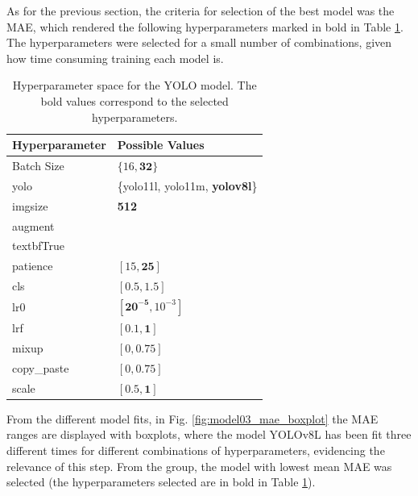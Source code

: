 \documentclass[conference]{IEEEtran}
\begin{document}
As for the previous section, the criteria for selection of the best model was the MAE, which rendered the following hyperparameters marked in bold in Table \ref{parametrosobjid}. The hyperparameters were selected for a small number of combinations, given how time consuming training each model is.



\begin{table}[H]
\centering
\caption{Hyperparameter space for the YOLO model. The bold values correspond to the selected hyperparameters.}
\label{parametrosobjid}
\begin{tabular}{ll}
\toprule
\textbf{Hyperparameter} & \textbf{Possible Values} \\
\midrule
Batch Size & $\{16, \mathbf{32}\}$ \\
yolo & \{yolo11l, yolo11m, \textbf{yolov8l}\} \\
imgsize & \textbf{512} \\
augment & \\textbf{True} \\
patience & $[15, \mathbf{25}]$ \\
cls & $[0.5, \mathbf{1.5}]$ \\
lr0 & $[\mathbf{20^{-5}}, 10^{-3}]$ \\
lrf & $[0.1, \mathbf{1}]$ \\
mixup & $[0, \mathbf{0.75}]$ \\
copy\_paste & $[0, \mathbf{0.75}]$ \\
scale & $[0.5, \mathbf{1}]$ \\
\bottomrule
\end{tabular}
\end{table}


From the different model fits, in Fig. \ref{fig:model03_mae_boxplot} the MAE ranges are displayed with boxplots, where the model YOLOv8L has been fit three different times for different combinations of hyperparameters, evidencing the relevance of this step. From the group, the model with lowest mean MAE was selected (the hyperparameters selected are in bold in Table \ref{parametrosobjid}).
\end{document}
